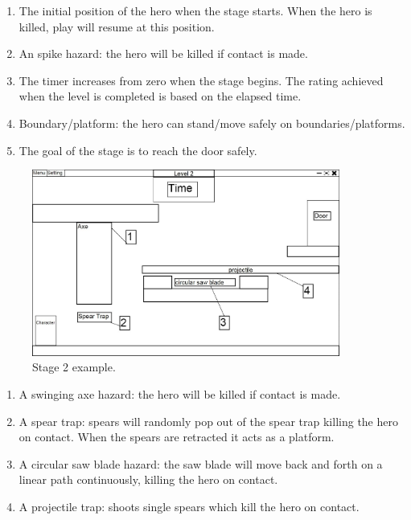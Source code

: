 \documentclass[12pt, titlepage]{article}
\begin{document}
\begin{enumerate}
  \item The initial position of the hero when the stage starts. When the hero is killed, play will resume at this position.
  \item An spike hazard: the hero will be killed if contact is made.
  \item The timer increases from zero when the stage begins.  The rating achieved when the level is completed is based on the elapsed time.
  \item Boundary/platform:  the hero can stand/move safely on boundaries/platforms.
  \item The goal of the stage is to reach the door safely.
\end{enumerate}

\newpage

\begin{figure}[hTB]
\begin{center}
\includegraphics[width=0.90\textwidth]{stage2}
\caption{Stage 2 example.} \label{fig:stage2}
\end{center}
\end{figure}


\begin{enumerate}
  \item A swinging axe hazard: the hero will be killed if contact is made.
  \item A spear trap: spears will randomly pop out of the spear trap killing the hero on contact.  When the spears are retracted it acts as a platform.
  \item A circular saw blade hazard: the saw blade will move back and forth on a linear path continuously, killing the hero on contact. 
  \item A projectile trap: shoots single spears which kill the hero on contact.
\end{enumerate}
\end{document}

